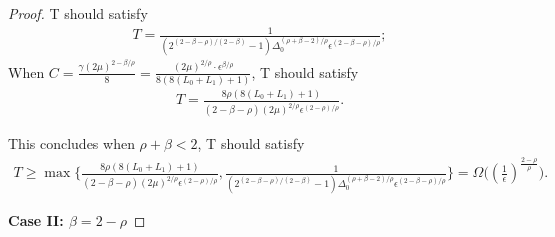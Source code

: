 \documentclass[10pt]{article} %
\newtheorem{proof}{Proof}
\begin{document}
\begin{proof}
T should satisfy 
\begin{align}
T= \frac{1}{(2^{(2-\beta-\rho)/(2-\beta)}-1)\Delta_0^{{(\rho+\beta-2)}/{\rho}}\epsilon^{(2-\beta-\rho)/{\rho}}};
\end{align}
When $C= \frac{\gamma(2\mu)^{{2-\beta}/{\rho}}}{8}=\frac{(2\mu)^{2/\rho}\cdot \epsilon^{\beta/\rho}}{8(8(L_0+L_1)+1)}$, 
T should satisfy
\begin{align}
T=\frac{8\rho(8(L_0+L_1)+1)}{(2-\beta-\rho)(2\mu)^{2/\rho}\epsilon^{(2-\rho)/{\rho}}}.
\end{align}

This concludes when $\rho+\beta<2$, T should satisfy 
\begin{align}
    T\geq \max \Big\{\frac{8\rho(8(L_0+L_1)+1)}{(2-\beta-\rho)(2\mu)^{2/\rho}\epsilon^{(2-\rho)/{\rho}}}, \frac{1}{(2^{(2-\beta-\rho)/(2-\beta)}-1)\Delta_0^{{(\rho+\beta-2)}/{\rho}}\epsilon^{(2-\beta-\rho)/{\rho}}} \Big\} = \Omega\big((\frac{1}{\epsilon})^{\frac{2-\rho}{\rho}}\big).
\end{align}

\noindent\textbf{Case II: $\beta=2-\rho$}


\end{proof}
\end{document}
